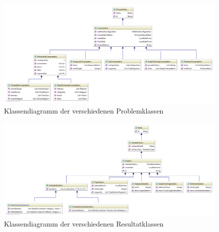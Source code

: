 \begin{landscape}

\begin{figure}[h]
\centering
\includegraphics[scale=0.65]{images/computations_diagramm.png}
\caption[Klassendiagramm der verschiedenen Problemklassen]{Klassendiagramm der verschiedenen Problemklassen \selfmade{}}
\label{fig:problems_diagramm}
\end{figure}

\begin{figure}[h]

\centering
\includegraphics[scale=0.63]{images/solutions_diagramm.png}
\caption[Klassendiagramm der verschiedenen Resultatklassen]{Klassendiagramm der verschiedenen Resultatklassen \selfmade{}}
\label{fig:solutions_diagramm}
\end{figure}

\end{landscape}